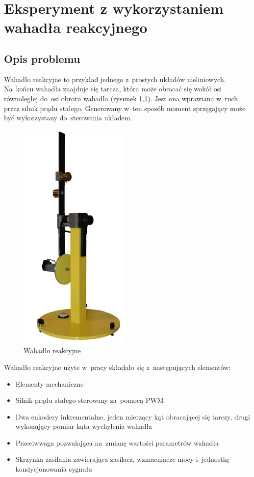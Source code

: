 \chapter{Eksperyment z wykorzystaniem wahadła reakcyjnego}
\label{cha:pendulum}
\section{Opis problemu}
\label{sec:pendulum_description}
Wahadło reakcyjne to przykład jednego z~prostych układów nieliniowych. Na~końcu wahadła znajduje się tarcza, która może obracać się wokół osi równoległej do~osi obrotu wahadła (rysunek \ref{fig:pendulum_picture}). Jest ona wprawiana w~ruch przez silnik prądu stałego. Generowany w~ten sposób moment sprzęgający może być wykorzystany do~sterowania układem. \par
\begin{figure}
	\centering
	\includegraphics[width=0.4\linewidth]{pendulum.jpg}
	\caption{Wahadło reakcyjne \cite{Pendulum_picture}}
	\label{fig:pendulum_picture}
\end{figure}
Wahadło reakcyjne użyte w~pracy składało się z~następujących elementów:
\begin{itemize}
	\item Elementy mechaniczne
	\item Silnik prądu stałego sterowany za~pomocą PWM
	\item Dwa enkodery inkrementalne, jeden mierzący kąt obracającej się tarczy, drugi wykonujący pomiar kąta wychylenia wahadła
	\item Przeciwwaga pozwalająca na~zmianę wartości parametrów wahadła
	\item Skrzynka zasilania zawierająca zasilacz, wzmacniacze mocy i~jednostkę kondycjonowania sygnału
\end{itemize}
